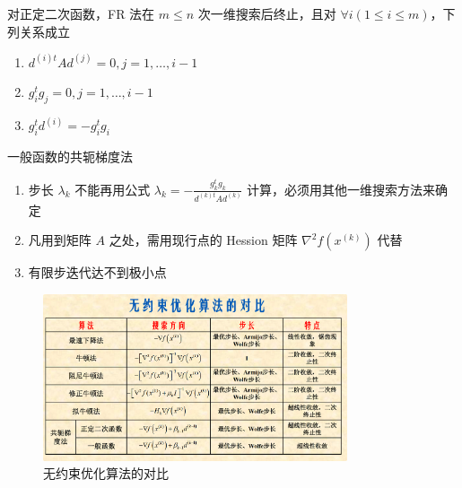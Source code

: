 \begin{theorem}
    对正定二次函数，FR 法在 $m \le n$ 次一维搜索后终止，且对 $\forall i(1 \le i \le m)$，下列关系成立
    \begin{enumerate}
        \item $d^{(i)t}Ad^{(j)} = 0, j = 1, \dots, i - 1$
        \item $g_i^tg_j = 0, j = 1, \dots, i - 1$
        \item $g_i^td^{(i)} = -g_i^tg_i$
    \end{enumerate}
\end{theorem}

\begin{note}
    一般函数的共轭梯度法\begin{enumerate}
        \item 步长 $\lambda_k$ 不能再用公式 $\lambda_k = -\frac{g_k^tg_k}{d^{(k)t}Ad^{(k)}}$ 计算，必须用其他一维搜索方法来确定
        \item 凡用到矩阵 $A$ 之处，需用现行点的 Hession 矩阵 $\nabla^2f(x^{(k)})$ 代替
        \item 有限步迭代达不到极小点
    \end{enumerate}
\end{note}

\begin{figure}[htbp]
    \centering
    \includegraphics[width=0.8\textwidth]{./figures/img3.png}
    \caption{无约束优化算法的对比 \label{fig3}}
\end{figure}
